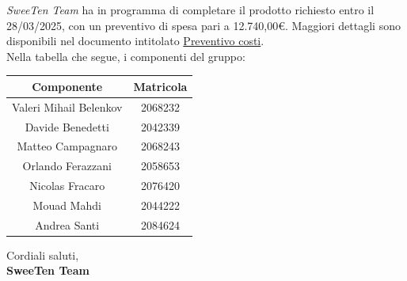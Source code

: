 \documentclass[italian, 12pt]{article}
\begin{document}
\textit{SweeTen Team} ha in programma di completare il prodotto richiesto entro il 28/03/2025, con un preventivo di spesa pari a 12.740,00€. Maggiori dettagli sono disponibili nel documento intitolato \underline{Preventivo costi}.
\\Nella tabella che segue, i componenti del gruppo:
\begin{flushleft}
    \begin{minipage}{0.6\textwidth}
        \begin{table}[H]
            \centering
            \begin{tabular}{|c|c|}
                \hline
                \textbf{Componente} & \textbf{Matricola} \\
                \hline
                Valeri Mihail Belenkov & 2068232 \\
        		Davide Benedetti 	& 2042339 \\
        		Matteo Campagnaro	& 2068243 \\
        		Orlando Ferazzani 	& 2058653 \\
        		Nicolas Fracaro 	& 2076420 \\
        		Mouad Mahdi		    & 2044222 \\ 
        		Andrea Santi 	    & 2084624 \\
                \hline
            \end{tabular}
        \end{table}
    \end{minipage}
    \hfill
    \begin{minipage}{0.35\textwidth}
        \vspace{1cm}
        \begin{flushleft}
            Cordiali saluti, \\
            \textbf{SweeTen Team}
        \end{flushleft}
    \end{minipage}
\end{flushleft}
\end{document}
